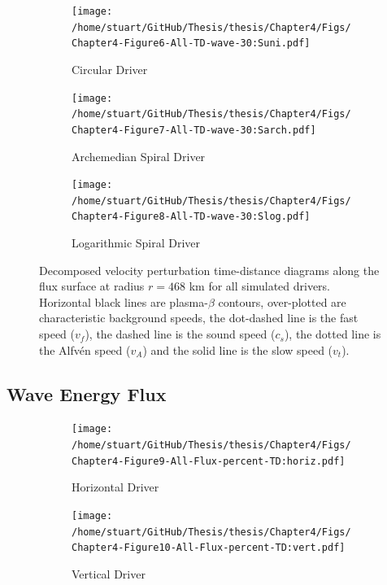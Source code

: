 \documentclass[a4paper,12pt,fourier,authoryear,custommargin]{Classes/PhDThesisPSnPDF}
\begin{document}
\begin{figure}
    \centering
\ContinuedFloat
    

    \begin{subfigure}[b]{0.9\columnwidth}
        \texttt{[image: /home/stuart/GitHub/Thesis/thesis/Chapter4/Figs/Chapter4-Figure6-All-TD-wave-30:Suni.pdf]}
        \caption{Circular Driver}
        \label{fig:All-TD-wave-30:Suni}
    \end{subfigure}

    \begin{subfigure}[b]{0.9\columnwidth}
        \texttt{[image: /home/stuart/GitHub/Thesis/thesis/Chapter4/Figs/Chapter4-Figure7-All-TD-wave-30:Sarch.pdf]}
        \caption{Archemedian Spiral Driver}
        \label{fig:All-TD-wave-30:Sarch}
    \end{subfigure}
    \caption{}
    \label{fig:}
\end{figure}

\begin{figure}
    \centering
\ContinuedFloat
    

    \begin{subfigure}[b]{0.9\columnwidth}
        \texttt{[image: /home/stuart/GitHub/Thesis/thesis/Chapter4/Figs/Chapter4-Figure8-All-TD-wave-30:Slog.pdf]}
        \caption{Logarithmic Spiral Driver}
        \label{fig:All-TD-wave-30:Slog}
    \end{subfigure}
    \caption{Decomposed velocity perturbation time-distance diagrams along the flux surface at radius $r = 468$ km for all simulated drivers. Horizontal black lines are plasma-$\beta$ contours, over-plotted are characteristic background speeds, the dot-dashed line is the fast speed ($v_f$), the dashed line is the sound speed ($c_s$), the dotted line is the Alfv\'en speed ($v_A$) and the solid line is the slow speed ($v_t$).}
    \label{fig:All-TD-wave-30}
\end{figure}


\subsection{Wave Energy Flux}\label{sec:energy_flux}



\begin{figure}
    \centering
    

    \begin{subfigure}[b]{0.9\columnwidth}
        \texttt{[image: /home/stuart/GitHub/Thesis/thesis/Chapter4/Figs/Chapter4-Figure9-All-Flux-percent-TD:horiz.pdf]}
        \caption{Horizontal Driver}
        \label{fig:All-Flux-percent-TD:horiz}
    \end{subfigure}

    \begin{subfigure}[b]{0.9\columnwidth}
        \texttt{[image: /home/stuart/GitHub/Thesis/thesis/Chapter4/Figs/Chapter4-Figure10-All-Flux-percent-TD:vert.pdf]}
        \caption{Vertical Driver}
        \label{fig:All-Flux-percent-TD:vert}
    \end{subfigure}
    \caption{}
    \label{fig:}
\end{figure}
\end{document}
